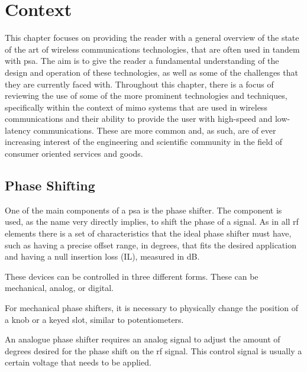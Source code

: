 \chapter{Context}
\label{chapter:ch2_context}

\par This chapter focuses on providing the reader with a general overview of the state of the art of wireless communications technologies, that are often used in tandem with \acl{psa}. The aim is to give the reader a fundamental understanding of the design and operation of these technologies, as well as some of the challenges that they are currently faced with. Throughout this chapter, there is a focus of reviewing the use of some of the more prominent technologies and techniques, specifically within the context of \ac{mimo} systems that are used in wireless communications and their ability to provide the user with high-speed and low-latency communications. These are more common and, as such, are of ever increasing interest of the engineering and scientific community in the field of consumer oriented services and goods.

\section{Phase Shifting}
\label{section:ch2_phase_shifting}

\par One of the main components of a \ac{psa} is the phase shifter. The component is used, as the name very directly implies, to shift the phase of a signal. As in all \ac{rf} elements there is a set of characteristics that the ideal phase shifter must have, such as having a precise offset range, in degrees,  that fits the desired application and having a null insertion loss (IL), measured in dB.

\par These devices can be controlled in three different forms. These can be mechanical, analog, or digital.

\par For mechanical phase shifters, it is necessary to physically change the position of a knob or a keyed slot, similar to potentiometers. 

\par An analogue phase shifter requires an analog signal to adjust the amount of degrees desired for the phase shift on the \ac{rf} signal. This control signal is usually a certain voltage that needs to be applied.

